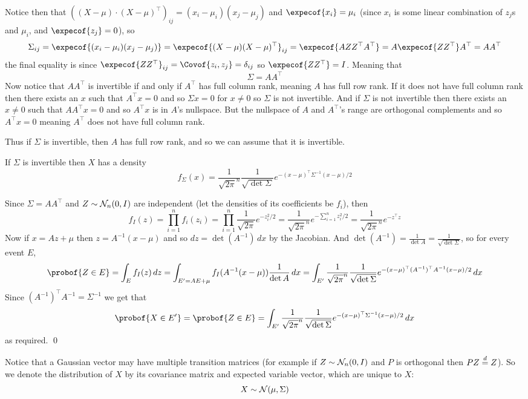 Notice then that $((X-\mu)\cdot(X-\mu)^\top)_{ij}=(x_i-\mu_i)(x_j-\mu_j)$ and $\expecof{x_i}=\mu_i$ (since $x_i$ is some linear combination of $z_j$s and $\mu_i$, and $\expecof{z_j}=0$), so
$$ \Sigma_{ij}=\expecof{(x_i-\mu_i)(x_j-\mu_j)}=\expecof{(X-\mu)(X-\mu)^\top}_{ij} = \expecof{AZZ^\top A^\top} = A\expecof{ZZ^\top}A^\top = AA^\top $$
the final equality is since $\expecof{ZZ^\top}_{ij}=\Covof{z_i,z_j}=\delta_{ij}$ so $\expecof{ZZ^\top}=I$.
Meaning that
$$ \Sigma = AA^\top $$
Now notice that $AA^\top$ is invertible if and only if $A^\top$ has full column rank, meaning $A$ has full row rank.
If it does not have full column rank then there exists an $x$ such that $A^\top x=0$ and so $\Sigma x=0$ for $x\neq0$ so $\Sigma$ is not invertible.
And if $\Sigma$ is not invertible then there exists an $x\neq0$ such that $AA^\top x=0$ and so $A^\top x$ is in $A$'s nullspace.
But the nullspace of $A$ and $A^\top$'s range are orthogonal complements and so $A^\top x=0$ meaning $A^\top$ does not have full column rank.

Thus if $\Sigma$ is invertible, then $A$ has full row rank, and so we can assume that it is invertible.

\bprop

    If $\Sigma$ is invertible then $X$ has a density
    $$ f_\Sigma(x) = \frac1{\sqrt{2\pi}^n}\frac1{\sqrt{\det\Sigma}}e^{-(x-\mu)^\top\Sigma^{-1}(x-\mu)/2} $$

\eprop

Since $\Sigma=AA^\top$ and $Z\sim{\cal N}_n(0,I)$ are independent (let the densities of its coefficients be $f_i$), then
$$ f_I(z) = \prod_{i=1}^n f_i(z_i) = \prod_{i=1}^n \frac1{\sqrt{2\pi}}e^{-z_i^2/2} = \frac1{\sqrt{2\pi}^n}e^{-\sum_{i=1}^nz_i^2/2} = \frac1{\sqrt{2\pi}^n}e^{-z^\top z} $$
Now if $x=Az+\mu$ then $z=A^{-1}(x-\mu)$ and so $dz=\det(A^{-1})\,dx$ by the Jacobian.
And $\det(A^{-1})=\frac1{\det A}=\frac1{\sqrt{\det\Sigma}}$, so for every event $E$,
$$ \probof{Z\in E} = \int_E f_I(z)\,dz = \int_{E'=AE+\mu}f_I(A^{-1}(x-\mu))\frac1{\det A}\,dx = \int_{E'}\frac1{\sqrt{2\pi}^n}\frac1{\sqrt{\det\Sigma}}e^{-(x-\mu)^\top(A^{-1})^\top A^{-1}(x-\mu)/2}\,dx $$
Since $(A^{-1})^\top A^{-1}=\Sigma^{-1}$ we get that
$$ \probof{X\in E'} = \probof{Z\in E} = \int_{E'}\frac1{\sqrt{2\pi}^n}\frac1{\sqrt{\det\Sigma}}e^{-(x-\mu)^\top\Sigma^{-1}(x-\mu)/2}\,dx $$
as required.
\qed

Notice that a Gaussian vector may have multiple transition matrices (for example if $Z\sim{\cal N}_n(0,I)$ and $P$ is orthogonal then $PZ\buildrel d\over=Z$). 
So we denote the distribution of $X$ by its covariance matrix and expected variable vector, which are unique to $X$:
$$ X\sim{\cal N}(\mu,\Sigma) $$

